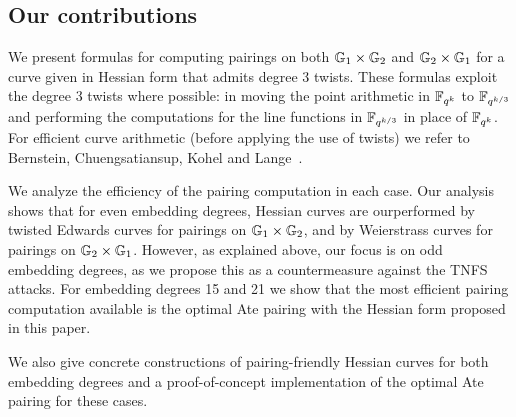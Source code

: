 


\subsection{Our contributions}

We present formulas for computing pairings on both $\mathbb{G}_{1} \times \mathbb{G}_{2}$ and $\mathbb{G}_{2} \times \mathbb{G}_{1}$ for a curve given in Hessian form that admits degree 3 twists.
These formulas exploit the degree 3 twists where possible: in moving the point arithmetic in $\mathbb{F}_{q^k}$ to $\mathbb{F}_{q^{k/3}}$ and performing the computations for the line functions in $\mathbb{F}_{q^{k/3}}$ in place of $\mathbb{F}_{q^k}$.
For efficient curve arithmetic (before applying the use of twists) we refer to
Bernstein, Chuengsatiansup, Kohel and Lange~\cite{2015/hessian}.

We analyze the efficiency of the pairing computation in each case. 
Our analysis shows that for even embedding degrees, Hessian curves are ourperformed by twisted Edwards curves for pairings on $\mathbb{G}_{1} \times \mathbb{G}_{2}$, and by Weierstrass curves for pairings on $\mathbb{G}_{2} \times \mathbb{G}_{1}$.
However, as explained above, our focus is on odd embedding degrees, as we propose 
this as a countermeasure against the TNFS attacks.
For embedding degrees 15 and 21 we show that the most efficient pairing
computation available is the optimal Ate pairing with the Hessian form proposed in this paper.

We also give concrete constructions of pairing-friendly Hessian curves for both embedding degrees and a proof-of-concept implementation of the optimal Ate pairing for these cases. 


